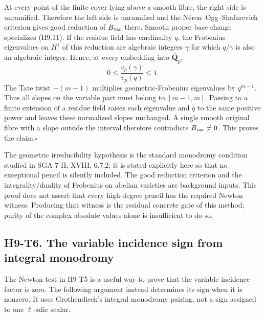 \documentclass[11pt,a4paper]{article}
\begin{document}
At every point of the finite cover lying above a smooth fibre, the
right side is unramified. Therefore the left side is unramified and
the N\'eron--Ogg--Shafarevich criterion gives good reduction of
$B_{\rm var}$ there. Smooth proper base change specializes (H9.11).
If the residue field has cardinality $q$, the Frobenius eigenvalues on
$H^1$ of this reduction are algebraic integers $\gamma$ for which
$q/\gamma$ is also an algebraic integer. Hence, at every embedding into
$\overline{\mathbf Q}_p$,
\[
 0\leq\frac{v_p(\gamma)}{v_p(q)}\leq1.
\]
The Tate twist $-(m-1)$ multiplies geometric-Frobenius eigenvalues by
$q^{m-1}$. Thus all slopes on the variable part must belong to
$[m-1,m]$. Passing to a finite extension of a residue field raises
each eigenvalue and $q$ to the same positive power and leaves these
normalized slopes unchanged. A single smooth original fibre with a
slope outside the interval therefore contradicts $B_{\rm var}\ne0$.
This proves the claim.\hfill$\square$

The geometric irreducibility hypothesis is the standard monodromy
condition studied in SGA 7 II, XVIII, 6.7.2; it is stated explicitly
here so that no exceptional pencil is silently included. The good
reduction criterion and the integrality/duality of Frobenius on abelian
varieties are background inputs. This proof does not assert that every
high-degree pencil has the required Newton witness. Producing that
witness is the residual concrete gate of this method; purity of the
complex absolute values alone is insufficient to do so.



\subsection*{H9-T6. The variable incidence sign from integral monodromy}

The Newton test in H9-T5 is a useful way to prove that the variable
incidence factor is zero. The following argument instead determines its
sign when it is nonzero. It uses Grothendieck's integral monodromy pairing,
not a sign assigned to one $\ell$-adic scalar.
\end{document}
